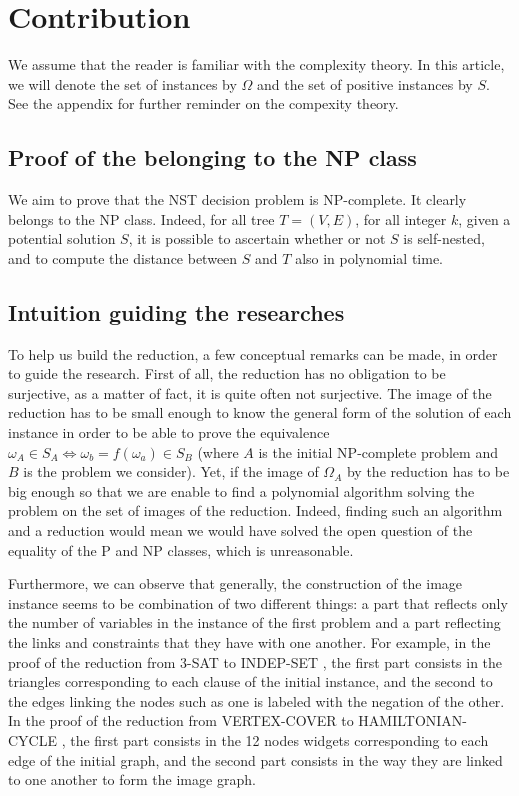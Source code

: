 \section{Contribution}

We assume that the reader is familiar with the complexity theory. In
this article, we will denote the set of instances by $\Omega$ and the
set of positive instances by $S$. See the appendix for further
reminder on the compexity theory.

\subsection{Proof of the belonging to the NP class}

We aim to prove that the NST decision problem is NP-complete. It
clearly belongs to the NP class. Indeed, for all tree $T = (V,E)$, for
all integer $k$, given a potential solution $S$, it is possible to
ascertain whether or not $S$ is self-nested, and to compute the
distance between $S$ and $T$ also in polynomial time.

\subsection{Intuition guiding the researches}
To help us build the reduction, a few conceptual remarks can be made,
in order to guide the research. First of all, the reduction has no
obligation to be surjective, as a matter of fact, it is quite often
not surjective. The image of the reduction has to be small enough to know the
general form of the solution of each instance in order to be able to
prove the equivalence
$\omega_{A} \in S_{A} \Leftrightarrow \omega_{b} = f(\omega_{a}) \in S_{B}$ (where
$A$ is the initial NP-complete problem and $B$ is the problem we
consider). Yet, if the image of $\Omega_{A}$ by the reduction has to
be big enough so that we are enable to find a polynomial algorithm
solving the problem on the set of images of the reduction. Indeed,
finding such an algorithm and a reduction would mean we would have
solved the open question of the equality of the P and NP classes,
which is unreasonable.

Furthermore, we can observe that generally, the construction of the
image instance seems to be combination of two different things: a part
that reflects only the number of variables in the instance of the
first problem and a part reflecting the links and constraints that
they have with one another.  For example, in the proof of the
reduction from 3-SAT to INDEP-SET \cite{polytech}, the first part
consists in the triangles corresponding to each clause of the initial
instance, and the second to the edges linking the nodes such as one is
labeled with the negation of the other. In the proof of the reduction
from VERTEX-COVER to HAMILTONIAN-CYCLE \cite{polytech}, the first part
consists in the 12 nodes widgets corresponding to each edge of the
initial graph, and the second part consists in the way they are linked
to one another to form the image graph.

